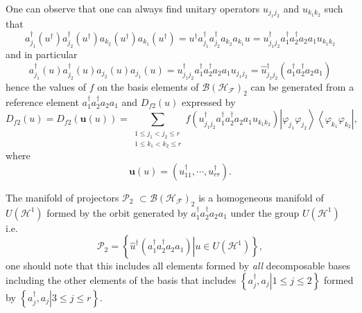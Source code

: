 \documentclass[aps,preprint]{revtex4}%
\begin{document}
One can observe that one can always find unitary operators $u_{j_{1}j_{2}}$
and $u_{k_{1}k_{2}}$ such that
\begin{equation}
a_{j_{1}}^{\dagger}\left(  u^{\dagger}\right)  a_{j_{2}}^{\dagger}\left(
u^{\dagger}\right)  a_{k_{2}}\left(  u^{\dagger}\right)  a_{k_{1}}\left(
u^{\dagger}\right)  =u^{\dagger}a_{j_{1}}^{\dagger}a_{j_{2}}^{\dagger}%
a_{k_{2}}a_{k_{1}}u=u_{j_{1}j_{2}}^{\dagger}a_{1}^{\dagger}a_{2}^{\dagger
}a_{2}a_{1}u_{k_{1}k_{2}}%
\end{equation}
and in particular
\begin{equation}
a_{j_{1}}^{\dagger}\left(  u\right)  a_{j_{2}}^{\dagger}\left(  u\right)
a_{j_{2}}\left(  u\right)  a_{j_{1}}\left(  u\right)  =u_{j_{1}j_{2}}%
^{\dagger}a_{1}^{\dagger}a_{2}^{\dagger}a_{2}a_{1}u_{j_{1}j_{2}}=\hat
{u}_{j_{1}j_{2}}^{\dagger}\left(  a_{1}^{\dagger}a_{2}^{\dagger}a_{2}%
a_{1}\right)
\end{equation}
hence the values of $f$ on the basis elements of $\mathcal{B}\left(
\mathcal{H}_{\mathcal{F}}\right)  _{2}$ can be generated from a reference
element $a_{1}^{\dagger}a_{2}^{\dagger}a_{2}a_{1}$ and $D_{f2}\left(
u\right)  $ expressed by
\begin{equation}
D_{f2}\left(  u\right)  =D_{f2}\left(  \mathbf{u}\left(  u\right)  \right)
=\sum_{\substack{1\leq j_{1}<j_{2}\leq r\\1\leq k_{1}<k_{2}\leq r}}f\left(
u_{j_{1}j_{2}}^{\dagger}a_{1}^{\dagger}a_{2}^{\dagger}a_{2}a_{1}u_{k_{1}k_{2}%
}\right)  \left\vert \varphi_{j_{1}}\varphi_{j_{2}}\right\rangle \left\langle
\varphi_{k_{1}}\varphi_{k_{2}}\right\vert ,
\end{equation}
where
\begin{equation}
\mathbf{u}\left(  u\right)  =\left(  u_{11}^{\dagger},\cdots,u_{rr}^{\dagger
}\right)  .
\end{equation}


The manifold of projectors $\mathcal{P}_{2}$ $\subset\mathcal{B}\left(
\mathcal{H}_{\mathcal{F}}\right)  _{2}$ is a homogeneous manifold of $U\left(
\mathcal{H}^{1}\right)  $ formed by the orbit generated by $a_{1}^{\dagger
}a_{2}^{\dagger}a_{2}a_{1}$ under the group $U\left(  \mathcal{H}^{1}\right)
$ i.e.
\begin{equation}
\mathcal{P}_{2}=\left\{  \left.  \hat{u}^{\dagger}\left(  a_{1}^{\dagger}%
a_{2}^{\dagger}a_{2}a_{1}\right)  \right\vert u\in U\left(  \mathcal{H}%
^{1}\right)  \right\}  ,
\end{equation}
one should note that this includes all elements formed by \emph{all
}decomposable\emph{ }bases including the other elements of the basis that
includes $\left\{  \left.  a_{j}^{\dagger},a_{j}\right\vert 1\leq
j\leq2\right\}  $ formed by $\left\{  \left.  a_{j}^{\dagger},a_{j}\right\vert
3\leq j\leq r\right\}  $.
\end{document}
